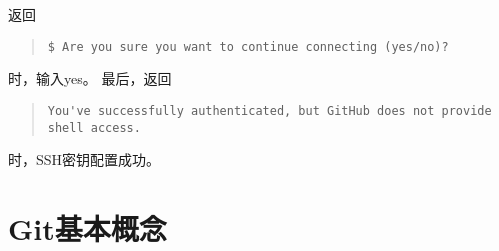\documentclass{article}
\begin{document}
\begin{enumerate}
\begin{quote}
\begin{lstlisting}
				\end{lstlisting}
			\end{quote}
			返回
			\begin{quote}
				\begin{lstlisting}
$ Are you sure you want to continue connecting (yes/no)?
				\end{lstlisting}
			\end{quote}
			时，输入yes。
			最后，返回
			\begin{quote}
				\begin{lstlisting}
You've successfully authenticated, but GitHub does not provide shell access.
				\end{lstlisting}
			\end{quote}
			时，SSH密钥配置成功。
		\end{enumerate}
	\section{Git基本概念} %
	\label{sec:git基本概念}
\end{document}

